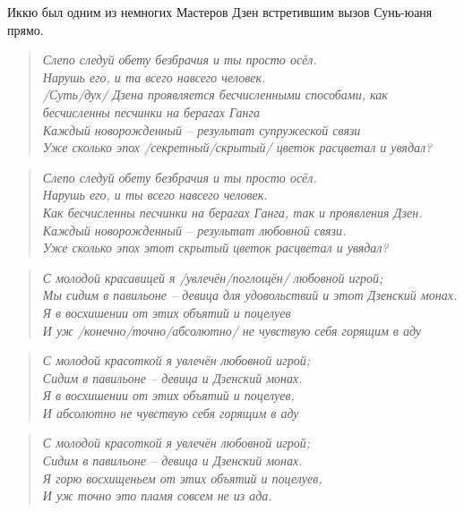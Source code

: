 \begin{ver}
Иккю был одним из немногих Мастеров Дзен встретившим вызов Сунь-юаня прямо. 
\end{ver}

\begin{ver}
\begin{verse}\it
  Слепо следуй обету безбрачия и ты просто осёл.\\
  Нарушь его, и та всего навсего человек.\\
  /Суть/дух/ Дзена проявляется бесчисленными способами, как
  бесчисленны песчинки на берагах Ганга\\
  Каждый новорожденный -- результат супружеской связи\\
  Уже сколько эпох /секретный/скрытый/ цветок расцветал и увядал?\\
\end{verse}
\end{ver}

\begin{ver}[1]
\begin{verse}\it
  Слепо следуй обету безбрачия и ты просто осёл.\\
  Нарушь его, и ты всего навсего человек.\\
  Как бесчисленны песчинки на берагах Ганга, так и проявления Дзен.\\
  Каждый новорожденный -- результат любовной связи.\\
  Уже сколько эпох этот скрытый цветок расцветал и увядал?\\
\end{verse}
\end{ver}

\begin{ver}
\begin{verse}\it
 С молодой красавицей я /увлечён/поглощён/ любовной игрой;\\
 Мы сидим в павильоне -- девица для удовольствий и этот Дзенский
 монах.\\
 Я в восхишении от этих объятий и поцелуев\\
 И уж /конечно/точно/абсолютно/ не чувствую себя горящим в аду
\end{verse}
\end{ver}

\begin{ver}[1]
\begin{verse}\it
 С молодой красоткой я увлечён любовной игрой;\\
 Сидим в павильоне -- девица и Дзенский
 монах.\\
 Я в восхишении от этих объятий и поцелуев,\\
 И абсолютно не чувствую себя горящим в аду
\end{verse}
\end{ver}

\begin{ver}[1]
\begin{verse}\it
 С молодой красоткой я увлечён любовной игрой;\\
 Сидим в павильоне -- девица и Дзенский
 монах.\\
 Я горю восхищеньем от этих объятий и поцелуев,\\
 И уж точно это пламя совсем не из ада.
\end{verse}
\end{ver}


